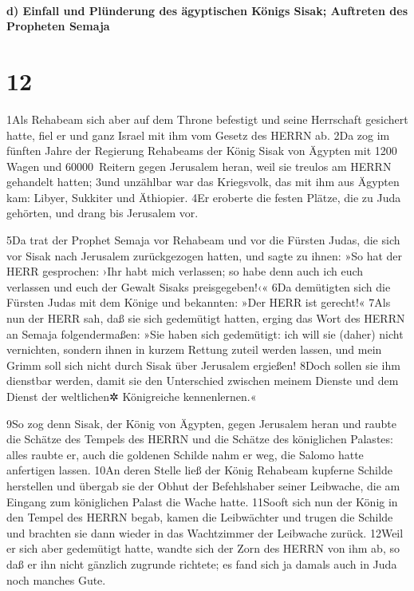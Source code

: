 \hypertarget{d-einfall-und-pluxfcnderung-des-uxe4gyptischen-kuxf6nigs-sisak-auftreten-des-propheten-semaja}{%
\paragraph{d) Einfall und Plünderung des ägyptischen Königs Sisak;
Auftreten des Propheten
Semaja}\label{d-einfall-und-pluxfcnderung-des-uxe4gyptischen-kuxf6nigs-sisak-auftreten-des-propheten-semaja}}

\hypertarget{section-11}{%
\section{12}\label{section-11}}

1Als Rehabeam sich aber auf dem Throne befestigt und seine Herrschaft
gesichert hatte, fiel er und ganz Israel mit ihm vom Gesetz des HERRN
ab. 2Da zog im fünften Jahre der Regierung Rehabeams der König Sisak von
Ägypten mit 1200 Wagen und 60000~Reitern gegen Jerusalem heran, weil sie
treulos am HERRN gehandelt hatten; 3und unzählbar war das Kriegsvolk,
das mit ihm aus Ägypten kam: Libyer, Sukkiter und Äthiopier. 4Er
eroberte die festen Plätze, die zu Juda gehörten, und drang bis
Jerusalem vor.

5Da trat der Prophet Semaja vor Rehabeam und vor die Fürsten Judas, die
sich vor Sisak nach Jerusalem zurückgezogen hatten, und sagte zu ihnen:
»So hat der HERR gesprochen: ›Ihr habt mich verlassen; so habe denn auch
ich euch verlassen und euch der Gewalt Sisaks preisgegeben!‹« 6Da
demütigten sich die Fürsten Judas mit dem Könige und bekannten: »Der
HERR ist gerecht!« 7Als nun der HERR sah, daß sie sich gedemütigt
hatten, erging das Wort des HERRN an Semaja folgendermaßen: »Sie haben
sich gedemütigt: ich will sie (daher) nicht vernichten, sondern ihnen in
kurzem Rettung zuteil werden lassen, und mein Grimm soll sich nicht
durch Sisak über Jerusalem ergießen! 8Doch sollen sie ihm dienstbar
werden, damit sie den Unterschied zwischen meinem Dienste und dem Dienst
der weltlichen✲ Königreiche kennenlernen.«

9So zog denn Sisak, der König von Ägypten, gegen Jerusalem heran und
raubte die Schätze des Tempels des HERRN und die Schätze des königlichen
Palastes: alles raubte er, auch die goldenen Schilde nahm er weg, die
Salomo hatte anfertigen lassen. 10An deren Stelle ließ der König
Rehabeam kupferne Schilde herstellen und übergab sie der Obhut der
Befehlshaber seiner Leibwache, die am Eingang zum königlichen Palast die
Wache hatte. 11Sooft sich nun der König in den Tempel des HERRN begab,
kamen die Leibwächter und trugen die Schilde und brachten sie dann
wieder in das Wachtzimmer der Leibwache zurück. 12Weil er sich aber
gedemütigt hatte, wandte sich der Zorn des HERRN von ihm ab, so daß er
ihn nicht gänzlich zugrunde richtete; es fand sich ja damals auch in
Juda noch manches Gute.

